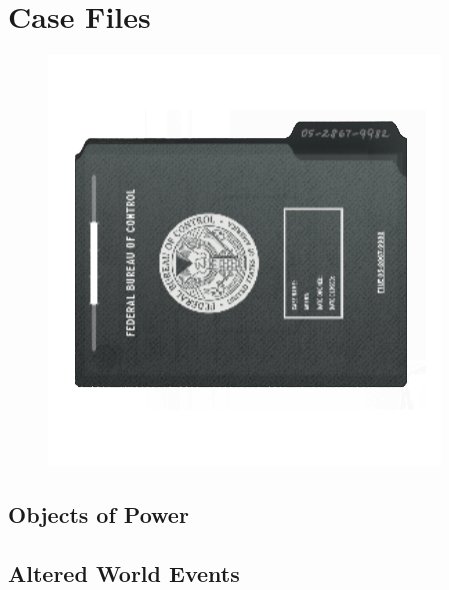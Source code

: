 \documentclass{article}
\begin{document}
	\chapter{Case Files}
	\begin{figure}[ht!]
		\centering
		\includegraphics[width=0.7\linewidth]{images/CaseFiles}
		\label{fig:casefiles}
	\end{figure}
	\section*{Objects of Power}
	
	
	
	
	
	
	
	
	
	
	
	\section*{Altered World Events}
	
	
	
	
	
	
	
	
	
	
	
	
	
	
	
	
	
	
	
	
	
	
	
	
	
\end{document}
